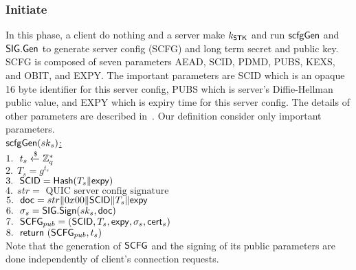 \subsubsection{Initiate}
In this phase, a client do nothing and a server make
$k_{\mathsf{STK}}$ and run $\mathsf{scfgGen}$ and $\mathsf{SIG}.\mathsf{Gen}$ to
generate server config (SCFG) and long term secret
and public key.
SCFG is composed of seven parameters AEAD, SCID, PDMD,
PUBS, KEXS, and OBIT, and EXPY. The important parameters
are SCID which is an opaque 16 byte identifier for
this server config, PUBS which is server's
Diffie-Hellman public value, and EXPY which is expiry time
for this server config. The details of other parameters
are described in~\cite{QUIC:Crypto}.
Our definition consider only important parameters.
\\
\noindent
\underline{$\mathsf{scfgGen}(sk_s)$:} \\
 $1.\ \ t_s \xleftarrow{\$} \mathbb{Z}_{q}^{\ast}$ \\
 $2.\ \ T_s = g^{t_s}$ \\
 $3.\ \ \mathsf{SCID} = \mathsf{Hash}(T_s \| \mathsf{expy})$ \\
 $4.\ \ str = \text{ QUIC server config signature }$ \\
 $5.\ \ \mathsf{doc} = str \| 0x00 \| \mathsf{SCID} \| T_s \| \mathsf{expy}$ \\
 $6.\ \ \sigma_s = \mathsf{SIG}.\mathsf{Sign}(sk_s, \mathsf{doc})$ \\
 $7.\ \ \mathsf{SCFG}_{pub} = (\mathsf{SCID}, T_s, \mathsf{expy}, \sigma_s, \mathsf{cert}_s)$ \\
 $8.\ \ \mathsf{return}\ (\mathsf{SCFG}_{pub}, t_s)$ \\
%
Note that the generation of $\mathsf{SCFG}$ and the signing
of its public parameters are done independently of
client's connection requests.